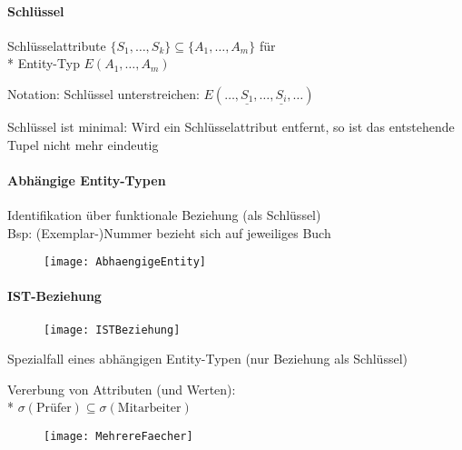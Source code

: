 \paragraph{Schlüssel}
\begin{items}
	\item Schlüsselattribute \( \{ S_1, \dots, S_k \} \subseteq \{ A_1, \dots, A_m \} \) für \\* Entity-Typ \( E(A_1, \dots, A_m) \)
	\item Notation: Schlüssel unterstreichen: \( E(\dots, \underline{S_1}, \dots, \underline{S_i}, \dots) \)
	\item Schlüssel ist minimal: Wird ein Schlüsselattribut entfernt, so ist das entstehende Tupel nicht mehr eindeutig
\end{items}

\paragraph{Abhängige Entity-Typen}
\begin{items}
	\item Identifikation über funktionale Beziehung (als Schlüssel)\\
	Bsp: (Exemplar-)Nummer bezieht sich auf jeweiliges Buch
\end{items}
\begin{figure}[H]\centering\label{AbhaengigeEntity}\texttt{[image: AbhaengigeEntity]}\end{figure}

\paragraph{IST-Beziehung}
\begin{figure}[H]\centering\label{ISTBeziehung}\texttt{[image: ISTBeziehung]}\end{figure}
\begin{items}
	\item Spezialfall eines abhängigen Entity-Typen (nur Beziehung als Schlüssel)
	\item Vererbung von Attributen (und Werten): \\* \( \sigma(\text{Prüfer}) \subseteq \sigma(\text{Mitarbeiter}) \)
\end{items}
\begin{figure}[H]\centering\label{MehrereFaecher}\texttt{[image: MehrereFaecher]}\end{figure}

